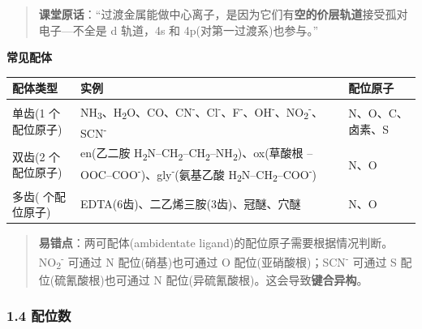 \begin{quote}
\textbf{课堂原话}：``过渡金属能做中心离子，是因为它们有\textbf{空的价层轨道}接受孤对电子---不全是 d 轨道，4s 和 4p(对第一过渡系)也参与。''
\end{quote}

\textbf{常见配体}

{\def\LTcaptype{none} %
\begin{longtable}[]{@{}
  >{\raggedright\arraybackslash}p{}
  >{\raggedright\arraybackslash}p{}
  >{\centering\arraybackslash}p{}@{}}
\toprule\noalign{}
\begin{minipage}[b]{\linewidth}\raggedright
配体类型
\end{minipage} & \begin{minipage}[b]{\linewidth}\raggedright
实例
\end{minipage} & \begin{minipage}[b]{\linewidth}\centering
配位原子
\end{minipage} \\
\midrule\noalign{}
\endhead
\bottomrule\noalign{}
\endlastfoot
单齿(1 个配位原子) & NH\textsubscript{3}、H\textsubscript{2}O、CO、CN\textsuperscript{-}、Cl\textsuperscript{-}、F\textsuperscript{-}、OH\textsuperscript{-}、NO\textsubscript{2}\textsuperscript{-}、SCN\textsuperscript{-} & N、O、C、卤素、S \\
双齿(2 个配位原子) & en(乙二胺 H\textsubscript{2}N--CH\textsubscript{2}--CH\textsubscript{2}--NH\textsubscript{2})、ox(草酸根 --OOC--COO\textsuperscript{-})、gly\textsuperscript{-}(氨基乙酸 H\textsubscript{2}N--CH\textsubscript{2}--COO\textsuperscript{-}) & N、O \\
多齿(3 个配位原子) & EDTA(6齿)、二乙烯三胺(3齿)、冠醚、穴醚 & N、O \\
\end{longtable}
}

\begin{quote}
\textbf{易错点}：两可配体(ambidentate ligand)的配位原子需要根据情况判断。NO\textsubscript{2}\textsuperscript{-} 可通过 N 配位(硝基)也可通过 O 配位(亚硝酸根)；SCN\textsuperscript{-} 可通过 S 配位(硫氰酸根)也可通过 N 配位(异硫氰酸根)。这会导致\textbf{键合异构}。
\end{quote}

\subsubsection{1.4 配位数}\label{ux914dux4f4dux6570}

